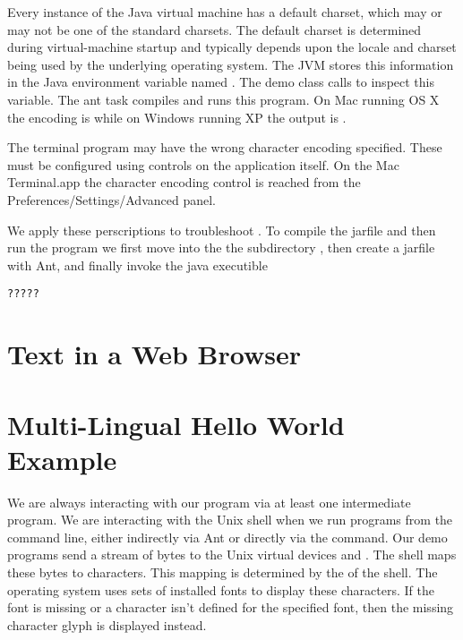 Every instance of the Java virtual machine has a default charset,
which may or may not be one of the standard charsets. The default
charset is determined during virtual-machine startup and typically
depends upon the locale and charset being used by the underlying
operating system.
The JVM stores this information in the Java environment variable named .
The demo class  
calls  to inspect this variable.
%
%
The ant task  compiles and runs this program.
On Mac running OS X the encoding is 
while on Windows running XP the output is .




The terminal program may have the wrong character encoding specified.
These must be configured using controls on the application itself.
On the Mac Terminal.app the character encoding control is reached from the
Preferences/Settings/Advanced panel.


We apply these perscriptions to troubleshoot .
To compile the jarfile and then run the program
we first move into the
the subdirectory ,
then create a jarfile with Ant,
and finally invoke the java executible
%
%
\begin{verbatim} 
?????
\end{verbatim}
%




\section{Text in a Web Browser}


\section{Multi-Lingual Hello World Example}\label{section:ant-console-config-utf8}

We are always interacting with our program via at least one intermediate program.
We are interacting with the Unix shell when we run programs from the command line,
either indirectly via Ant or directly via the  command.
Our demo programs send a stream of bytes to the Unix virtual devices
 and . 
The shell maps these bytes to characters.
This mapping is determined by the  of the shell.
The operating system uses sets of installed fonts to display these characters.
If the font is missing or a character isn't defined for the specified font,
then the missing character glyph is displayed instead.

